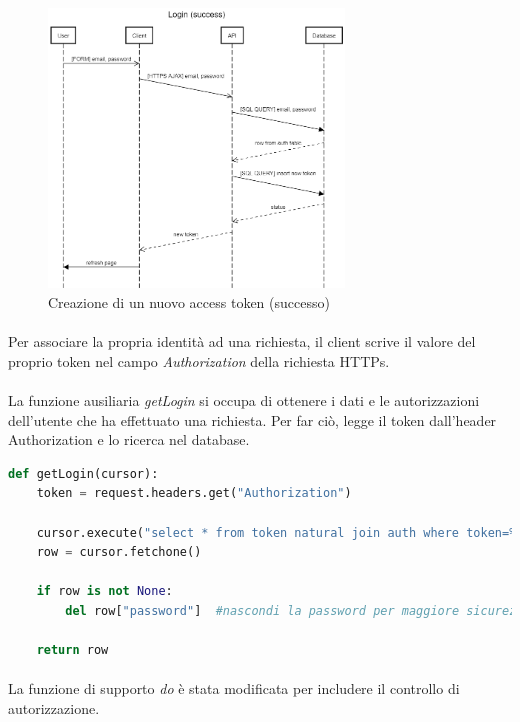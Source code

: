 \documentclass[12pt,a4paper,twoside,english,italian]{book}
\begin{document}
\begin{figure}[H]
    \centering
    \includegraphics[width=0.7\textwidth]{img/Login (success).png}
    \caption{Creazione di un nuovo access token (successo)}
\end{figure}

\paragraph{} Per associare la propria identità ad una richiesta, il client scrive il valore del proprio token nel campo \emph{Authorization} della richiesta HTTPs. 

\paragraph{} La funzione ausiliaria \emph{getLogin} si occupa di ottenere i dati e le autorizzazioni dell'utente che ha effettuato una richiesta. Per far ciò, legge il token dall'header Authorization e lo ricerca nel database.


\begin{lstlisting}[language=Python, caption=funzione ausiliaria getLogin]
def getLogin(cursor):
    token = request.headers.get("Authorization")

    cursor.execute("select * from token natural join auth where token=%s", (token, ))
    row = cursor.fetchone()

    if row is not None:
        del row["password"]  #nascondi la password per maggiore sicurezza
 
    return row
\end{lstlisting}

\paragraph{} La funzione di supporto \emph{do} è stata modificata per includere il controllo di autorizzazione. 
\end{document}
